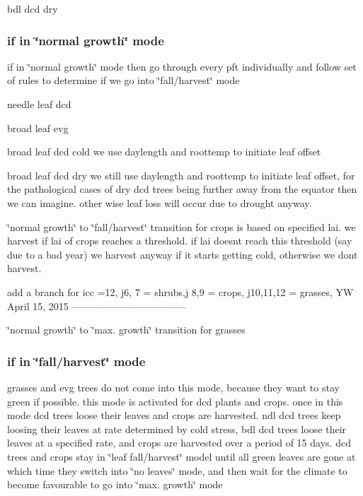 bdl dcd dry

\subsubsection*{if in \char`\"{}normal growth\char`\"{} mode }

if in \char`\"{}normal growth\char`\"{} mode then go through every pft individually and follow set of rules to determine if we go into \char`\"{}fall/harvest\char`\"{} mode

needle leaf dcd

broad leaf evg

broad leaf dcd cold we use daylength and roottemp to initiate leaf offset

broad leaf dcd dry we still use daylength and roottemp to initiate leaf offset, for the pathological cases of dry dcd trees being further away from the equator then we can imagine. other wise leaf loss will occur due to drought anyway.

\char`\"{}normal growth\char`\"{} to \char`\"{}fall/harvest\char`\"{} transition for crops is based on specified lai. we harvest if lai of crops reaches a threshold. if lai doesn\textquotesingle{}t reach this threshold (say due to a bad year) we harvest anyway if it starts getting cold, otherwise we don\textquotesingle{}t harvest.

\begin{DoxyVerb}add a branch for icc =12, j6, 7 = shrubs,j 8,9 = crops, j10,11,12
= grasses, YW April 15, 2015 -----------------------------------\ \end{DoxyVerb}


\char`\"{}normal growth\char`\"{} to \char`\"{}max. growth\char`\"{} transition for grasses

\subsubsection*{if in \char`\"{}fall/harvest\char`\"{} mode }

grasses and evg trees do not come into this mode, because they want to stay green if possible. this mode is activated for dcd plants and crops. once in this mode dcd trees loose their leaves and crops are harvested. ndl dcd trees keep loosing their leaves at rate determined by cold stress, bdl dcd trees loose their leaves at a specified rate, and crops are harvested over a period of 15 days. dcd trees and crops stay in \char`\"{}leaf fall/harvest\char`\"{} model until all green leaves are gone at which time they switch into \char`\"{}no leaves\char`\"{} mode, and then wait for the climate to become favourable to go into \char`\"{}max. growth\char`\"{} mode

